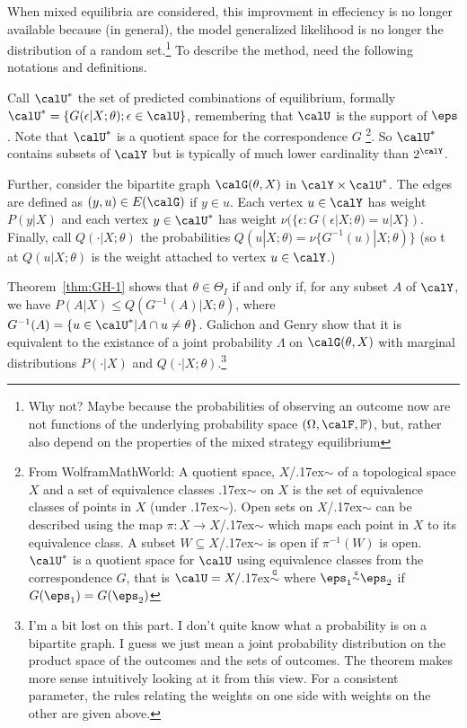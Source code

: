 When mixed equilibria are considered, this improvment in effeciency is no longer available because (in general), the model generalized likelihood is no longer the distribution of a random set.\footnote{Why not? Maybe because the probabilities of observing an outcome now are not functions of the underlying probability space $(\Omega, \calF, \mathbb{P})$, but, rather also depend on the properties of the mixed strategy equilibrium} To describe the method, need the following notations and definitions. 

Call $\calU^*$ the set of predicted combinations of equilibrium, formally $\calU^* = \{G(\epsilon|X;\theta); \epsilon \in \calU\}$, remembering that $\calU$ is the support of $\eps$. Note that $\calU^*$ is a quotient space for the correspondence $G$
\footnote{From WolframMathWorld: A quotient space, $X$/{\raise.17ex\hbox{$\scriptstyle\mathtt{\sim}$}} of a topological space $X$ and a set of equivalence classes {\raise.17ex\hbox{$\scriptstyle\mathtt{\sim}$}} on $X$ is the set of equivalence classes of points in $X$ (under {\raise.17ex\hbox{$\scriptstyle\mathtt{\sim}$}}). Open sets on $X$/{\raise.17ex\hbox{$\scriptstyle\mathtt{\sim}$}} can be described using the map $\pi: X\rightarrow X$/{\raise.17ex\hbox{$\scriptstyle\mathtt{\sim}$}} which maps each point in $X$ to its equivalence class. A subset $W \subseteq X$/{\raise.17ex\hbox{$\scriptstyle\mathtt{\sim}$}} is open if $\pi^{-1}(W)$ is open. $\calU^*$ is a quotient space for $\calU$ using equivalence classes from the correspondence $G$, that is $\calU = X/${\raise.17ex\hbox{$\scriptstyle\mathtt{\overset{G}\sim}$}} where $\eps_1{\raise.17ex\hbox{$\scriptstyle\mathtt{\overset{G}\sim}$}} \eps_2$ if $G(\eps_1) = G(\eps_2)$}. 
So $\calU^*$ contains subsets of $\calY$ but is typically of much lower cardinality than $2^\calY$. 

Further, consider the bipartite graph $\calG(\theta, X)$ in $\calY \times \calU^*$. The edges are defined as $(y,u) \in E(\calG)$ if $y \in u$. Each vertex $u \in \calY$ has weight $P(y|X)$ and each vertex $y\in \calU^*$ has weight $\nu(\{\epsilon: G(\epsilon|X;\theta) = u|X\})$. Finally, call $Q(\cdot|X;\theta)$ the probabilities $Q(u|X;\theta) = \nu\{G^{-1}(u)| X;\theta)\}$ (so t at $Q(u|X;\theta)$ is the weight attached to vertex $u \in \calY$.)

Theorem~\ref{thm:GH-1} shows that $\theta \in \Theta_I$ if and only if, for any subset $A$ of $\calY$, we have $P(A|X) \leq Q(G^{-1}(A)|X;\theta)$, where $G^{-1}(A) = \{u\in\calU^* | A\cap u \neq \theta\}$. Galichon and Genry show that it is equivalent to the existance of a joint probability $\Lambda$ on $\calG(\theta, X)$ with marginal distributions $P(\cdot| X)$ and $Q(\cdot|X;\theta)$.\footnote{I'm a bit lost on this part. I don't quite know what a probability is on a bipartite graph. I guess we just mean a joint probability distribution on the product space of the outcomes and the sets of outcomes. The theorem makes more sense intuitively looking at it from this view. For a consistent parameter, the rules relating the weights on one side with weights on the other are given above.}

